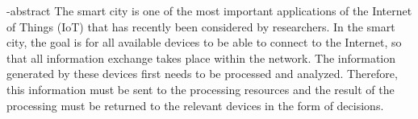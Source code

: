 

\begin{latin}
  
  
  \en-abstract{
	The smart city is one of the most important applications of the Internet of Things (IoT) that has recently been considered by researchers. In the smart city, the goal is for all available devices to be able to connect to the Internet, so that all information exchange takes place within the network.
	The information generated by these devices first needs to be processed and analyzed. Therefore, this information must be sent to the processing resources and the result of the processing must be returned to the relevant devices in the form of decisions.
  }

  \cleartoleftpage
  \latinabstractPage
  \cleartoleftpage
  \latinfirstPage
\end{latin}
